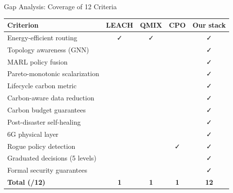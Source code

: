 \documentclass[10pt,aspectratio=169]{beamer}
\begin{document}
\begin{frame}[t]{Gap Analysis: Coverage of 12 Criteria}
\centering
\footnotesize
\renewcommand{\arraystretch}{0.95}
\begin{tabular}{@{}lcccc@{}}
  \toprule
  \textbf{Criterion} & \textbf{LEACH} & \textbf{QMIX} & \textbf{CPO} & \textbf{Our stack} \\
  \midrule
  Energy-efficient routing & \faCheck & \faCheck & & \faCheck \\
  Topology awareness (GNN) & & & & \faCheck \\
  MARL policy fusion & & & & \faCheck \\
  Pareto-monotonic scalarization & & & & \faCheck \\
  Lifecycle carbon metric & & & & \faCheck \\
  Carbon-aware data reduction & & & & \faCheck \\
  Carbon budget guarantees & & & & \faCheck \\
  Post-disaster self-healing & & & & \faCheck \\
  6G physical layer & & & & \faCheck \\
  Rogue policy detection & & & \faCheck & \faCheck \\
  Graduated decisions (5 levels) & & & & \faCheck \\
  Formal security guarantees & & & & \faCheck \\
  \midrule
  \textbf{Total (/12)} & \textbf{1} & \textbf{1} & \textbf{1} & \textbf{12} \\
  \bottomrule
\end{tabular}
\end{frame}
\end{document}
